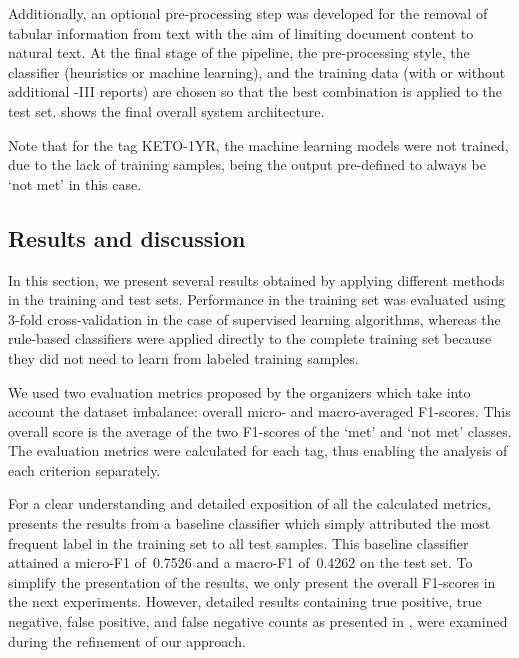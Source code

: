 

Additionally, an optional pre-processing step was developed for the removal of tabular information from text with the aim of limiting document content to natural text.
At the final stage of the pipeline, the pre-processing style, the classifier (heuristics or machine learning), and the training data (with or without additional -III reports) are chosen so that the best combination is applied to the test set.
 shows the final overall system architecture.

Note that for the tag \textsf{KETO-1YR}, the machine learning models were not trained, due to the lack of training samples, being the output pre-defined to always be `not met' in this case.




\subsection{Results and discussion}

In this section, we present several results obtained by applying different methods in the training and test sets.
Performance in the training set was evaluated using 3-fold cross-validation in the case of supervised learning algorithms, whereas the rule-based classifiers were applied directly to the complete training set because they did not need to learn from labeled training samples.

We used two evaluation metrics proposed by the  organizers which take into account the dataset imbalance: overall micro- and macro-averaged F1-scores.
This overall score is the average of the two F1-scores of the `met' and `not met' classes.
The evaluation metrics were calculated for each tag, thus enabling the analysis of each criterion separately.



For a clear understanding and detailed exposition of all the calculated metrics,  presents the results from a baseline classifier which simply attributed the most frequent label in the training set to all test samples.
This baseline classifier attained a micro-F1 of~0.7526 and a macro-F1 of~0.4262 on the test set.
To simplify the presentation of the results, we only present the overall F1-scores in the next experiments.
However, detailed results containing true positive, true negative, false positive, and false negative counts as presented in , were examined during the refinement of our approach.

